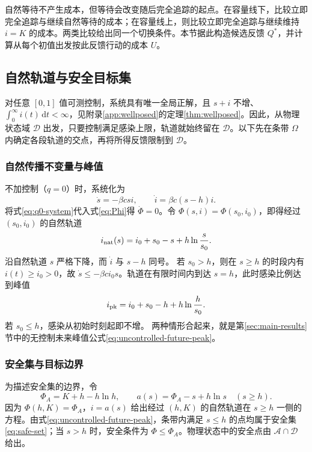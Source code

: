 \documentclass[lang=cn,a4paper,newtx]{elegantpaper}
\theoremstyle{plain}
\theoremstyle{definition}
\newcommand{\Acal}{\mathcal A}
\newcommand{\Dcal}{\mathcal D}
\newcommand{\dd}{\,\mathrm d}
\begin{document}
自然等待不产生成本，但等待会改变随后完全追踪的起点。在容量线下，比较立即完全追踪与继续自然等待的成本；在容量线上，则比较立即完全追踪与继续维持 $i=K$ 的成本。两类比较给出同一个切换条件。本节据此构造候选反馈 $Q^*$，并计算从每个初值出发按此反馈行动的成本 $U$。

\subsection{自然轨道与安全目标集}
\label{sec:constant-problem}
对任意 $[0,1]$ 值可测控制，系统具有唯一全局正解，且 $s+i$ 不增、$\int_0^\infty i(t)\dd t<\infty$，见附录\ref{app:wellposed}的定理\ref{thm:wellposed}。因此，从物理状态域 $\Dcal$ 出发，只要控制满足感染上限，轨道就始终留在 $\Dcal$。以下先在条带 $\Omega$ 内确定各段轨道的交点，再将所得反馈限制到 $\Dcal$。

\subsubsection{自然传播不变量与峰值}
不加控制（$q=0$）时，系统化为
\begin{equation}
\dot s=-\beta csi,\qquad \dot i=\beta c(s-h)i.
\label{eq:q0-system}
\end{equation}
将式\eqref{eq:q0-system}代入式\eqref{eq:Phi}得 $\dot\Phi=0$。令 $\Phi(s,i)=\Phi(s_0,i_0)$，即得经过 $(s_0,i_0)$ 的自然轨道
\begin{equation}
i_{\rm nat}(s)=i_0+s_0-s+h\ln\frac{s}{s_0}.
\label{eq:natural-orbit}
\end{equation}
沿自然轨道 $s$ 严格下降，而 $\dot i$ 与 $s-h$ 同号。
若 $s_0>h$，则在 $s\ge h$ 的时段内有 $i(t)\ge i_0>0$，故 $\dot s\le-\beta ci_0s$。轨道在有限时间内到达 $s=h$，此时感染比例达到峰值
\begin{equation}
i_{\rm pk}=i_0+s_0-h+h\ln\frac h{s_0}.
\label{eq:natural-peak}
\end{equation}
若 $s_0\le h$，感染从初始时刻起即不增。
两种情形合起来，就是第\ref{sec:main-results}节中的无控制未来峰值公式\eqref{eq:uncontrolled-future-peak}。

\subsubsection{安全集与目标边界}
为描述安全集的边界，令
\begin{equation}
\Phi_A=K+h-h\ln h,\qquad
 a(s)=\Phi_A-s+h\ln s\quad(s\ge h).
\label{eq:safe-boundary}
\end{equation}
因为 $\Phi(h,K)=\Phi_A$，$i=a(s)$ 给出经过 $(h,K)$ 的自然轨道在 $s\ge h$ 一侧的方程。由式\eqref{eq:uncontrolled-future-peak}，条带内满足 $s\le h$ 的点均属于安全集\eqref{eq:safe-set}；当 $s>h$ 时，安全条件为 $\Phi\le\Phi_A$。物理状态中的安全点由 $\Acal\cap\Dcal$ 给出。
\end{document}
